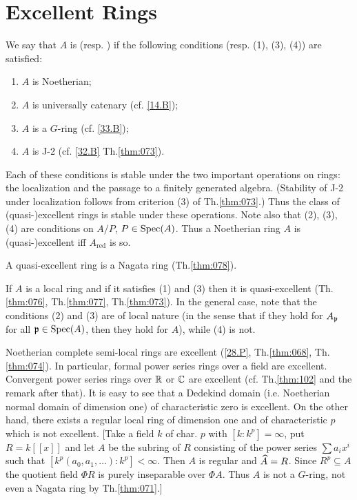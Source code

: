 \documentclass[../main]{subfiles}
\begin{document}
\section{Excellent Rings}\label{sec:34}

\begin{pardefinition}
We say that $A$ is  (resp. ) if the following conditions (resp. (1), (3), (4)) are satisfied:

\begin{enumerate}[label = (\arabic*)]
    \item $A$ is Noetherian;
    \item $A$ is universally catenary (cf. \ref{14.B});
    \item $A$ is a $G$-ring (cf. \ref{33.B});
    \item $A$ is J-2 (cf. \ref{32.B} Th.\ref{thm:073}).
\end{enumerate}
\end{pardefinition}

Each of these conditions is stable under the two important operations on rings: the localization and the passage to a finitely generated algebra. (Stability of J-2 under localization follows from criterion (3) of Th.\ref{thm:073}.) Thus the class of (quasi-)excellent rings is stable under these operations. Note also that (2), (3), (4) are conditions on $A/P$, $P \in \operatorname{Spec}(A)$. Thus a Noetherian ring $A$ is (quasi-)excellent iff $A_{\text{red}}$ is so. 

A quasi-excellent ring is a Nagata ring (Th.\ref{thm:078}).

If $A$ is a local ring and if it satisfies (1) and (3) then it is quasi-excellent (Th.\ref{thm:076}, Th.\ref{thm:077}, Th.\ref{thm:073}). In the general case, note that the conditions (2) and (3) are of local nature (in the sense that if they hold for $A_{\mathfrak{p}}$ for all $\mathfrak{p} \in \operatorname{Spec}(A)$, then they hold for $A$), while (4) is not.

\newparagraph Noetherian complete semi-local rings are excellent (\ref{28.P}, Th.\ref{thm:068}, Th.\ref{thm:074}). In particular, formal power series rings over a field are excellent. Convergent power series rings over $\mathbb{R}$ or $\mathbb{C}$ are excellent (cf. Th.\ref{thm:102} and the remark after that). It is easy to see that a Dedekind domain (i.e. Noetherian normal domain of dimension one) of characteristic zero is excellent. On the other hand, there exists a regular local ring of dimension one and of characteristic $p$ which is not excellent. [Take a field $k$ of char. $p$ with $[k : k^p] = \infty$, put $R = k[[x]]$ and let $A$ be the subring of $R$ consisting of the power series $\sum a_i x^i$ such that $[k^p(a_0, a_1, \ldots) : k^p] < \infty$. Then $A$ is regular and $\widehat{A} = R$. Since $R^p \subseteq A$ the quotient field $\Phi R$ is purely inseparable over $\Phi A$. Thus $A$ is not a $G$-ring, not even a Nagata ring by Th.\ref{thm:071}.]
\end{document}
